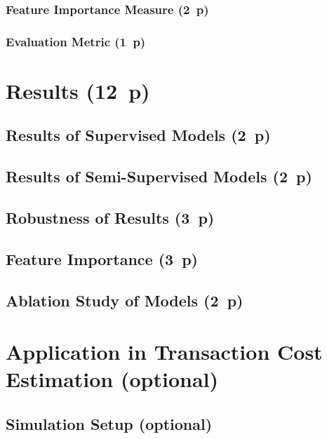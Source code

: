\subsubsection{Feature Importance
  Measure (2~p)}\label{sec:feature-importance-measure}

\subsubsection{Evaluation Metric (1~p)}\label{sec:evaluation-metric}

\newpage
\section{Results (12~p)}\label{sec:results}

\subsection{Results of Supervised
  Models (2~p)}\label{sec:results-of-supervised-models}

\subsection{Results of Semi-Supervised
  Models (2~p)}\label{sec:results-of-semi-supervised-models}

\subsection{Robustness of Results (3~p)}\label{sec:robustness-checks}

\subsection{Feature Importance (3~p)}\label{sec:feature-importance}

\subsection{Ablation Study of Models (2~p)}\label{sec:ablation-study}

\newpage
\section{Application in Transaction Cost Estimation (optional)}\label{sec:application}
\subsection{Simulation Setup (optional)}\label{sec:simulation-setup}
